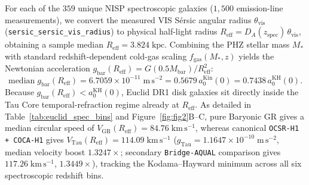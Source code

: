 \documentclass[11pt,a4paper]{article}
\begin{document}
For each of the $359$ unique NISP spectroscopic galaxies ($1,500$ emission-line measurements), we convert the measured VIS S\'ersic angular radius $\theta_{\mathrm{vis}}$ (\texttt{sersic\_\allowbreak sersic\_\allowbreak vis\_\allowbreak radius}) to physical half-light radius $R_{\mathrm{eff}} = D_A(z_{\mathrm{spec}})\,\theta_{\mathrm{vis}}$, obtaining a sample median $R_{\mathrm{eff}} = 3.824\;\mathrm{kpc}$. Combining the PHZ stellar mass $M_*$ with standard redshift-dependent cold-gas scaling $f_{\mathrm{gas}}(M_*, z)$ yields the Newtonian acceleration $g_{\mathrm{bar}}(R_{\mathrm{eff}}) = G(0.5 M_{\mathrm{bar}})/R_{\mathrm{eff}}^2$:
\begin{equation}
  \mathrm{median}\;g_{\mathrm{bar}}(R_{\mathrm{eff}}) = 6.7059 \times 10^{-11}\;\mathrm{m\,s^{-2}} = 0.5679\,a_0^{\mathrm{Kin}}(0) = 0.7438\,a_0^{\mathrm{KH}}(0).
\end{equation}
Because $g_{\mathrm{bar}}(R_{\mathrm{eff}}) < a_0^{\mathrm{KH}}(0)$, Euclid DR1 disk galaxies sit directly inside the Tau Core temporal-refraction regime already at $R_{\mathrm{eff}}$. As detailed in Table~\ref{tab:euclid_spec_bins} and Figure~\ref{fig:fig2}B--C, pure Baryonic GR gives a median circular speed of $V_{\mathrm{GR}}(R_{\mathrm{eff}}) = 84.76\;\mathrm{km\,s^{-1}}$, whereas canonical \texttt{OCSR-H1 + COCA-H1} gives $V_{\mathrm{Tau}}(R_{\mathrm{eff}}) = 114.09\;\mathrm{km\,s^{-1}}$ ($g_{\mathrm{Tau}} = 1.1647\times 10^{-10}\;\mathrm{m\,s^{-2}}$, median velocity boost $1.3247\times$; secondary \texttt{Bridge-AQUAL} comparison gives $117.26\;\mathrm{km\,s^{-1}}$, $1.3449\times$), tracking the Kodama--Hayward minimum across all six spectroscopic redshift bins.
\end{document}
